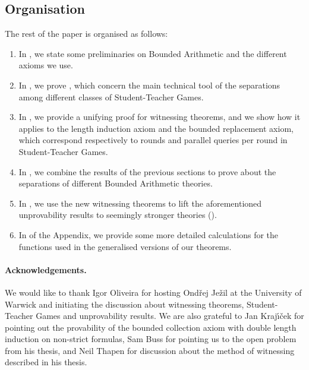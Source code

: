 \documentclass[11pt]{article}
\theoremstyle{definition}
\theoremstyle{definition}
\theoremstyle{remark}
\begin{document}
\subsection{Organisation}

The rest of the paper is organised as follows:
\begin{enumerate}
    \item In , we state some preliminaries on Bounded Arithmetic and the different axioms we use.
    \item In , we prove , which concern the main technical tool of the separations among different classes of Student-Teacher Games.
    \item In , we provide a unifying proof for witnessing theorems, and we show how it applies to the length induction axiom and the bounded replacement axiom, which correspond respectively to rounds and parallel queries per round in Student-Teacher Games.
    \item In , we combine the results of the previous sections to prove  about the separations of different Bounded Arithmetic theories.
    \item In , we use the new witnessing theorems to lift the aforementioned unprovability results to seemingly stronger theories ().
    \item In  of the Appendix, we provide some more detailed calculations for the functions used in the generalised versions of our theorems.
\end{enumerate}




\paragraph{Acknowledgements.} We would like to thank Igor Oliveira for hosting Ondřej Ježil at the University of Warwick and initiating the discussion about witnessing theorems, Student-Teacher Games and unprovability results. We are also grateful to Jan Kraj{\'\i}{\v{c}}ek for pointing out the provability of the bounded collection axiom with double length induction on non-strict formulas, Sam Buss for pointing us to the open problem from his thesis, and Neil Thapen for discussion about the method of witnessing described in his thesis.
\end{document}
